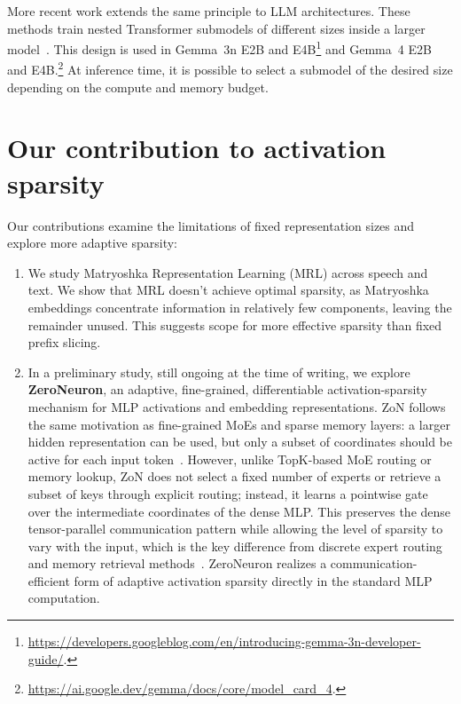More recent work extends the same principle to LLM architectures. 
These methods train nested Transformer submodels of different sizes 
inside a larger model~\citep{devvrit2024matformer}. This design is used in
Gemma~3n E2B and E4B\footnote{\url{https://developers.googleblog.com/en/introducing-gemma-3n-developer-guide/}.}
and Gemma~4 E2B and E4B.\footnote{\url{https://ai.google.dev/gemma/docs/core/model_card_4}.}
At inference time, it is possible to select a submodel of the desired size
depending on the compute and memory budget.



\section{Our contribution to activation sparsity}
Our contributions examine the limitations of fixed representation
sizes and explore more adaptive sparsity:
\begin{enumerate}
    \item We study Matryoshka Representation Learning (MRL) across speech
    and text. We show that MRL doesn't achieve optimal sparsity,
    as Matryoshka embeddings concentrate information
    in relatively few components, leaving the remainder unused.
    This suggests scope for more effective sparsity than fixed prefix slicing.

    \item In a preliminary study, still ongoing at the time of writing,
    we explore \textbf{ZeroNeuron}, an adaptive, fine-grained,
    differentiable activation-sparsity mechanism for MLP activations and
    embedding representations. ZoN follows the same motivation as fine-grained
    MoEs and sparse memory layers: a larger hidden representation can be used,
    but only a subset of coordinates should be active for each input
    token~\citep{krajewski2024scaling,lample2019largememorylayersproduct,
    he2024mixturemillionexperts}. However, unlike TopK-based MoE routing or
    memory lookup, ZoN does not select a fixed number of experts or retrieve
    a subset of keys through explicit routing; instead, it learns a pointwise
    gate over the intermediate coordinates of the dense MLP. This preserves the
    dense tensor-parallel communication pattern while allowing the level of
    sparsity to vary with the input, which is the key difference from
    discrete expert routing and memory retrieval
    methods~\citep{huang2024hardertasksneedexperts,
    wang2025remoefullydifferentiablemixtureofexperts,
    huang2025ultrasparsememorynetwork}. ZeroNeuron realizes a communication-
    efficient form of adaptive activation sparsity directly in the standard
    MLP computation.
\end{enumerate}
